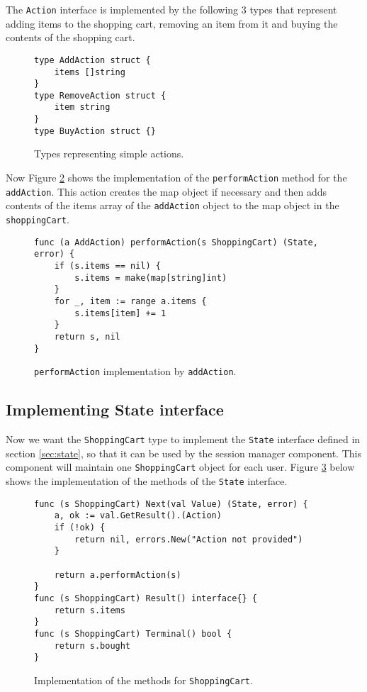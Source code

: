 \documentclass[12pt,a4paper]{article}
\begin{document}
The \texttt{Action} interface is implemented by the following 3 types
that represent adding items to the shopping cart, removing an item from it
and buying the contents of the shopping cart.
\begin{figure}[h]
\begin{lstlisting}
type AddAction struct {
    items []string
}
type RemoveAction struct {
    item string
}
type BuyAction struct {}
\end{lstlisting}
\caption[scale=1.0]{Types representing simple actions.}
\label{fig:actions}
\end{figure}

Now Figure \ref{fig:addAction} shows the implementation of the \texttt{performAction}
method for the \texttt{addAction}. This action creates the map object if necessary and
then adds contents of the items array of the \texttt{addAction} object to the map
object in the \texttt{shoppingCart}.
\begin{figure}[h]
\begin{lstlisting}
func (a AddAction) performAction(s ShoppingCart) (State, error) {
    if (s.items == nil) {
        s.items = make(map[string]int)
    }
    for _, item := range a.items {
        s.items[item] += 1
    }
    return s, nil
}
\end{lstlisting}
\caption[scale=1.0]{\texttt{performAction} implementation by \texttt{addAction}.}
\label{fig:addAction}
\end{figure}

\subsection{Implementing State interface}
Now we want the \texttt{ShoppingCart} type to implement the \texttt{State} 
interface defined in section
\ref{sec:state}, so that it can be used by the session manager component.
This component will maintain one \texttt{ShoppingCart} object for each user.
Figure \ref{fig:shoppingCartImpl} below shows the implementation of the 
methods of the \texttt{State} interface.
\begin{figure}[h]
\begin{lstlisting}
func (s ShoppingCart) Next(val Value) (State, error) {
    a, ok := val.GetResult().(Action)
    if (!ok) {
        return nil, errors.New("Action not provided")
    }

    return a.performAction(s)
}
func (s ShoppingCart) Result() interface{} {
    return s.items
}
func (s ShoppingCart) Terminal() bool {
    return s.bought
}
\end{lstlisting}
\caption[scale=1.0]{Implementation of the methods for \texttt{ShoppingCart}.}
\label{fig:shoppingCartImpl}
\end{figure}
\end{document}
